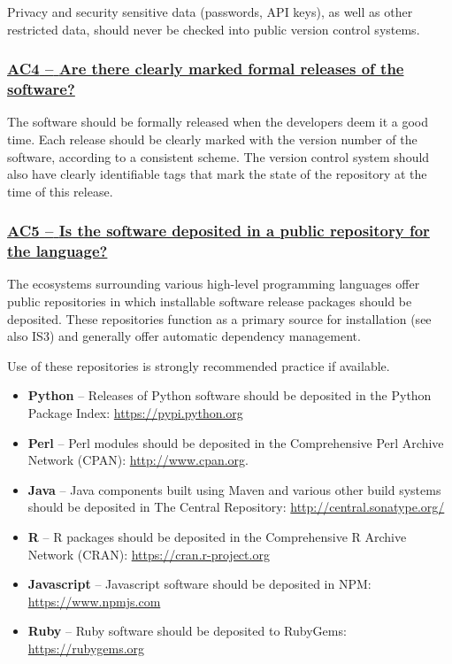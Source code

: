 \documentclass[a4paper,11pt]{article}
\newcommand{\indicator}[1]{\subsubsection*{\underline{#1}}}
\begin{document}
Privacy and security sensitive data (passwords, API keys), as well as other
restricted data, should never be checked into public version control systems.

\newcommand{\acFourName}{AC4}
\newcommand{\acFourID}{\acFourName}
\newcommand{\acFourText}{Are there clearly marked formal releases of the software?}
\indicator{\acFourName{ }--{ }\acFourText}\label{id:ac4} 

The software should be formally released when the developers deem it a good
time. Each release should be clearly marked with the version number of the
software, according to a consistent scheme. The version control system should
also have clearly identifiable tags that mark the state of the repository at
the time of this release.

\newcommand{\acFiveName}{AC5}
\newcommand{\acFiveID}{\acFiveName}
\newcommand{\acFiveText}{Is the software deposited in a public repository for the language?}
\indicator{\acFiveName{ }--{ }\acFiveText}\label{id:ac5} 

The ecosystems surrounding various high-level programming languages offer
public repositories in which installable software release packages should be
deposited. These repositories function as a primary source for installation (see also
IS3) and generally offer automatic dependency management.

Use of these repositories is strongly recommended practice if available.

\begin{itemize}
    \item \textbf{Python} -- Releases of Python software should be deposited in
        the Python Package Index: \url{https://pypi.python.org}
    \item \textbf{Perl} --  Perl modules should be deposited in the Comprehensive
        Perl Archive Network (CPAN): \url{http://www.cpan.org}.
    \item \textbf{Java} -- Java components built using Maven and various other
        build systems should be deposited in The Central Repository: \url{http://central.sonatype.org/}
    \item \textbf{R} -- R packages should be deposited in the Comprehensive R
        Archive Network (CRAN): \url{https://cran.r-project.org}
    \item \textbf{Javascript} -- Javascript software should be deposited in
        NPM: \url{https://www.npmjs.com}
    \item \textbf{Ruby} -- Ruby software should be deposited to 
        RubyGems: \url{https://rubygems.org}
\end{itemize}
\end{document}
